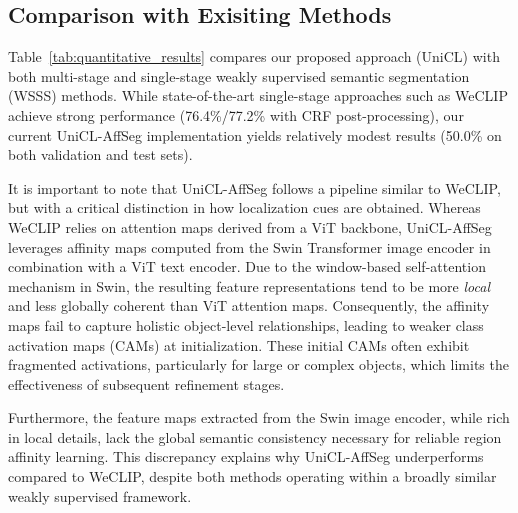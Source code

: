 \subsection{Comparison with Exisiting Methods}
\label{subsec:comparison_with_baseline_methods}
Table~\ref{tab:quantitative_results} compares our proposed approach (UniCL) with both multi-stage and single-stage weakly supervised semantic segmentation (WSSS) methods. While state-of-the-art single-stage approaches such as WeCLIP achieve strong performance (76.4\%/77.2\% with CRF post-processing), our current UniCL-AffSeg implementation yields relatively modest results (50.0\% on both validation and test sets).  

It is important to note that UniCL-AffSeg follows a pipeline similar to WeCLIP, but with a critical distinction in how localization cues are obtained. Whereas WeCLIP relies on attention maps derived from a ViT backbone, UniCL-AffSeg leverages affinity maps computed from the Swin Transformer image encoder in combination with a ViT text encoder. Due to the window-based self-attention mechanism in Swin, the resulting feature representations tend to be more \textit{local} and less globally coherent than ViT attention maps. Consequently, the affinity maps fail to capture holistic object-level relationships, leading to weaker class activation maps (CAMs) at initialization. These initial CAMs often exhibit fragmented activations, particularly for large or complex objects, which limits the effectiveness of subsequent refinement stages.  

Furthermore, the feature maps extracted from the Swin image encoder, while rich in local details, lack the global semantic consistency necessary for reliable region affinity learning. This discrepancy explains why UniCL-AffSeg underperforms compared to WeCLIP, despite both methods operating within a broadly similar weakly supervised framework.  






